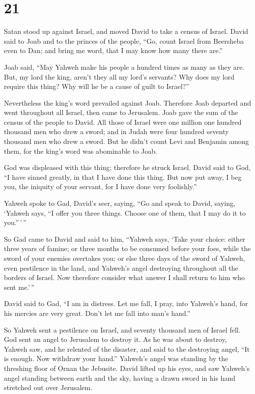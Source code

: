 \hypertarget{section-20}{%
\section{21}\label{section-20}}

 Satan stood up against Israel, and moved David to take a
census of Israel.  David said to Joab and to the princes
of the people, ``Go, count Israel from Beersheba even to Dan; and bring
me word, that I may know how many there are.''

 Joab said, ``May Yahweh make his people a hundred times
as many as they are. But, my lord the king, aren't they all my lord's
servants? Why does my lord require this thing? Why will he be a cause of
guilt to Israel?''

 Nevertheless the king's word prevailed against Joab.
Therefore Joab departed and went throughout all Israel, then came to
Jerusalem.  Joab gave the sum of the census of the people
to David. All those of Israel were one million one hundred thousand men
who drew a sword; and in Judah were four hundred seventy thousand men
who drew a sword.  But he didn't count Levi and Benjamin
among them, for the king's word was abominable to Joab.

 God was displeased with this thing; therefore he struck
Israel.  David said to God, ``I have sinned greatly, in
that I have done this thing. But now put away, I beg you, the iniquity
of your servant, for I have done very foolishly.''

 Yahweh spoke to Gad, David's seer, saying,
 ``Go and speak to David, saying, `Yahweh says, ``I offer
you three things. Choose one of them, that I may do it to you.''\,'\,''

 So Gad came to David and said to him, ``Yahweh says,
`Take your choice:  either three years of famine; or
three months to be consumed before your foes, while the sword of your
enemies overtakes you; or else three days of the sword of Yahweh, even
pestilence in the land, and Yahweh's angel destroying throughout all the
borders of Israel. Now therefore consider what answer I shall return to
him who sent me.'\,''

 David said to Gad, ``I am in distress. Let me fall, I
pray, into Yahweh's hand, for his mercies are very great. Don't let me
fall into man's hand.''

 So Yahweh sent a pestilence on Israel, and seventy
thousand men of Israel fell.  God sent an angel to
Jerusalem to destroy it. As he was about to destroy, Yahweh saw, and he
relented of the disaster, and said to the destroying angel, ``It is
enough. Now withdraw your hand.'' Yahweh's angel was standing by the
threshing floor of Ornan the Jebusite.  David lifted up
his eyes, and saw Yahweh's angel standing between earth and the sky,
having a drawn sword in his hand stretched out over Jerusalem.

